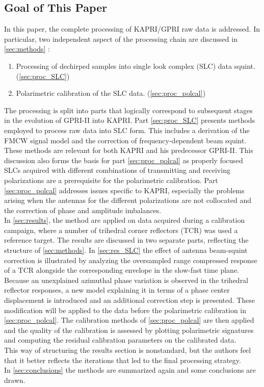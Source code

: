 \subsection{Goal of This Paper}
In this paper, the complete processing of KAPRI/GPRI raw data is addressed. In particular, two independent aspect of the processing chain are discussed in \autoref{sec:methods} :
\begin{enumerate}
	\item Processing of dechirped samples into single look complex (SLC) data squint. (\autoref{sec:proc_SLC})
	\item Polarimetric calibration of the SLC data. (\autoref{sec:proc_polcal})
\end{enumerate}
The processing is split into parts that logically correspond to subsequent stages in the evolution of GPRI-II into KAPRI. Part \ref{sec:proc_SLC} presents  methods employed to process raw data into SLC form. This includes a derivation of the FMCW signal model and the correction of frequency-dependent beam squint. These methods are relevant for both KAPRI and his predecessor GPRI-II. This discussion also forms the basis for part \ref{sec:proc_polcal} as properly focused SLCs acquired with different combinations of transmitting and receiving polarizations are a prerequisite for the polarimetric calibration. Part \ref{sec:proc_polcal} addresses issues specific to KAPRI, especially the problems arising when the antennas for the different polarizations are not collocated and the correction of phase and amplitude imbalances.\\
In \autoref{sec:results}, the method are applied on data acquired during a calibration campaign, where a number of trihedral corner reflectors (TCR) was used a reference target. The results are discussed in two separate parts, reflecting the structure of \autoref{sec:methods}. In \autoref{sec:res_SLC} the effect of antenna beam-squint correction is illustrated by analyzing the oversampled range compressed response of a TCR alongside the corresponding envelope in the slow-fast time plane. Because an unexplained azimuthal phase variation is observed in the trihedral reflector responses, a new model explaining it in terms of a phase center displacement is introduced and an additional correction step is presented. These modification will be applied to the data before the polarimetric calibration in \ref{sec:proc_polcal}. The calibration methods of \ref{sec:proc_polcal} are then applied  and the quality of the calibration is assessed by plotting polarimetric signatures and computing the residual calibration parameters on the calibrated data.\\ This way of structuring the results section is nonstandard, but the authors feel that it better reflects the iterations that led to the final processing strategy.\\
In \autoref{sec:conclusions} the methods are summarized again and some conclusions are drawn.